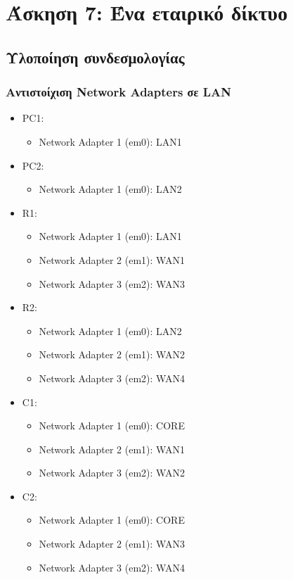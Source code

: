 \documentclass[a4paper, 12pt]{article}
\begin{document}
\section*{Άσκηση 7: Ένα εταιρικό δίκτυο}
	\subsection*{Υλοποίηση συνδεσμολογίας}
		\subsubsection*{Αντιστοίχιση Network Adapters σε LAN} 
			\begin{itemize}
				\item PC1:
					\begin{itemize}
						\item Network Adapter 1 (em0): LAN1
					\end{itemize}
				\item PC2:
					\begin{itemize}
						\item Network Adapter 1 (em0): LAN2
					\end{itemize}

				\item R1:
					\begin{itemize}
						\item Network Adapter 1 (em0): LAN1
						\item Network Adapter 2 (em1): WAN1
						\item Network Adapter 3 (em2): WAN3
					\end{itemize}
		
				\item R2:
					\begin{itemize}
						\item Network Adapter 1 (em0): LAN2
						\item Network Adapter 2 (em1): WAN2
						\item Network Adapter 3 (em2): WAN4
					\end{itemize}
	
				\item C1:
					\begin{itemize}
						\item Network Adapter 1 (em0): CORE
						\item Network Adapter 2 (em1): WAN1
						\item Network Adapter 3 (em2): WAN2	
					\end{itemize}
		
				\item C2:
					\begin{itemize}
						\item Network Adapter 1 (em0): CORE
						\item Network Adapter 2 (em1): WAN3
						\item Network Adapter 3 (em2): WAN4
					\end{itemize}
		
			\end{itemize}
\end{document}
